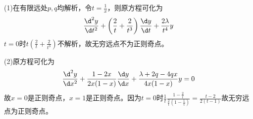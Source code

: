 \documentclass{phyasgn}
\begin{document}
\begin{sol}[5]
    (1)在有限远处$p,q$均解析，令$t=\frac{1}{x}$，则原方程可化为
    \begin{align*}
        \frac{\d^2y}{\d t^2}+\left(\frac{2}{t}+\frac{2}{t^3}\right)\frac{\d y}{\d t}+\frac{2\lambda}{t^4}y
    \end{align*}
    $t=0$时$t\left(\frac{2}{t}+\frac{2}{t^3}\right)$不解析，故无穷远点不为正则奇点。\par
    (2)原方程可化为
    \begin{align*}
        \frac{\d ^2y}{\d x^2}+\frac{1-2x}{2x(1-x)}\frac{\d y}{\d x}+\frac{\lambda+2q-4qx}{4x(1-x)}y=0
    \end{align*}
    故$x=0$是正则奇点，$x=1$是正则奇点。因为$t=0$时$\frac{1}{t}\frac{1-\frac{2}{t}}{\frac{2}{t}(1-\frac{1}{t})}=\frac{t-2}{2(t-1)}$故无穷远点为正则奇点。
\end{sol}\par
\end{document}
